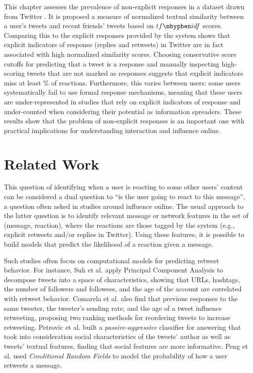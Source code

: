 This chapter assesses the prevalence of non-explicit responses in a dataset drawn from Twitter \cite{BarbosaNeto2013, Barbosa}. It is proposed a measure of normalized textual similarity between a user's tweets and recent friends' tweets based on $tf\mhyphen idf$ scores.  Comparing this to the explicit responses provided by the system shows that explicit indicators of response (replies and retweets) in Twitter are in fact associated with high normalized similarity scores.  Choosing conservative score cutoffs for predicting that a tweet is a response and manually inspecting high-scoring tweets that are not marked as responses suggests that explicit indicators miss at least \highNonTaggedTweetCountPct{}\% of reactions. 
Furthermore, this varies between users: some users systematically fail to use formal response mechanisms, meaning that these users are under-represented in studies that rely on explicit indicators of response and under-counted when considering their potential as information spreaders. These results show that the problem of non-explicit responses is an important one with practical implications for understanding interaction and influence online.

\section{Related Work}

This question of identifying when a user is reacting to some other users' content can be considered a dual 
question to ``is the user going to react to this message'', a question often asked in studies around influence online. 
The usual approach to the latter question is to identify relevant message or network features in the set of (message, reaction), where the reactions are those tagged by the system (e.g., explicit retweets and/or replies in Twitter).  
Using these features, it is possible to build models that predict the likelihood of a reaction given a message.

Such studies often focus on computational models for predicting retweet behavior.  
For instance, Suh et al. \cite{Suh2010} apply Principal Component Analysis to decompose tweets into a space of characteristics, showing that URLs, hashtags, the number of followers and followees, and the age of the account are correlated with retweet behavior. 
Comarela et al. \cite{Comarela2012} also find that previous responses to the same tweeter, the tweeter's sending rate, and the age of a tweet influence retweeting, proposing two ranking methods for reordering tweets to increase retweeting.  
Petrovic et al. \cite{Petrovic2011} built a \textit{passive-aggressive} classifier for answering that took into consideration social characteristics of the tweets' author as well as tweets' textual features, finding that social features are more informative.  
Peng et al. \cite{Peng2011} used \textit{Conditional Random Fields} to model the probability of how a user retweets a message. 

